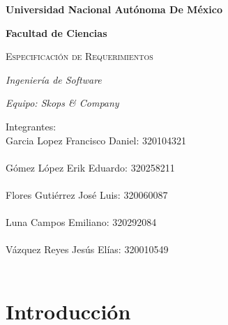 \documentclass{article}
\begin{document}
\begin{titlepage}
        \centering
        {\bfseries\LARGE Universidad Nacional Autónoma De México\par}
        {\bfseries\LARGE Facultad de Ciencias\par}
        \vspace{1cm}
        \vspace{2cm}
        {\scshape\Huge\textcolor{green(ncs)}{Especificación de Requerimientos}\par}
        \vspace{3cm}
        {\itshape\Large Ingeniería de Software \par}
        \vspace{2cm}
        {\itshape\Large Equipo: Skops \& Company \par}
        \vspace{2cm}
        {\Large Integrantes:}\\ 
        \vspace{1.0cm}
        {\Large Garcia Lopez Francisco Daniel: 320104321}\\
        \phone \\
        {\Large Gómez López Erik Eduardo: 320258211}\\
        \phone\\
        {\Large Flores Gutiérrez José Luis: 320060087}\\
        \phone \\
        {\Large Luna Campos Emiliano: 320292084}\\
        \phone\\
        {\Large Vázquez Reyes Jesús Elías: 320010549}\\
        \phone\\
\end{titlepage}

\section{Introducción}
\end{document}
